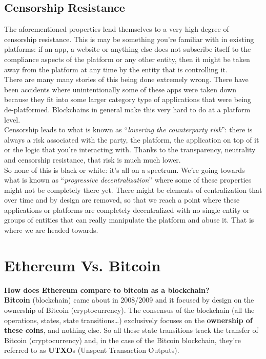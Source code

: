 \subsection*{Censorship Resistance}

The aforementioned properties lend themselves to a very high degree of censorship resistance.
This is may be something you're familiar with in existing platforms: if an app, a website or anything else does not subscribe itself to the compliance aspects of the platform or any other entity, then it might be taken away from the platform at any time by the entity that is controlling it.\\

There are many many stories of this being done extremely wrong.
There have been accidents where unintentionally some of these apps were taken down because they fit into some larger category type of applications that were being de-platformed.
Blockchains in general make this very hard to do at a platform level.\\

Censorship leads to what is known as ``\textit{lowering the counterparty risk}'': there is always a risk associated with the party, the platform, the application on top of it or the logic that you're interacting with.
Thanks to the transparency, neutrality and censorship resistance, that risk is much much lower.\\

So none of this is black or white: it's all on a spectrum.
We're going towards what is known as ``\textit{progressive decentralization}'' where some of these properties might not be completely there yet.
There might be elements of centralization that over time and by design are removed, so that we reach a point where these applications or platforms are completely decentralized with no single entity or groups of entities that can really manipulate the platform and abuse it. 
That is where we are headed towards.

\section{Ethereum Vs. Bitcoin}

\textbf{How does Ethereum compare to bitcoin as a blockchain?}\\

\textbf{Bitcoin} (blockchain) came about in 2008/2009 and it focused by design on the ownership of Bitcoin (cryptocurrency).
The consensus of the blockchain (all the operations, states, state transitions\dots) exclusively focuses on the \textbf{ownership of these coins}, and nothing else.
So all these state transitions track the transfer of Bitcoin (cryptocurrency) and, in the case of the Bitcoin blockchain, they're referred to as \textbf{UTXO}s (Unspent Transaction Outputs).\\

